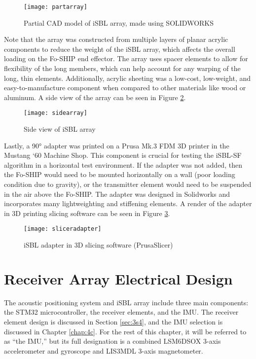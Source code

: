 \documentclass[12pt,a4paper]{report}
\begin{document}
\begin{figure}[htbp]
	\centering
	\texttt{[image: partarray]}
	\caption{Partial CAD model of iSBL array, made using SOLIDWORKS}
	\label{fig:partarray}
\end{figure}

Note that the array was constructed from multiple layers of planar acrylic components to reduce the weight of the iSBL array, which affects the overall loading on the Fo-SHIP end effector. The array uses spacer elements to allow for flexibility of the long members, which can help account for any warping of the long, thin elements. Additionally, acrylic sheeting was a low-cost, low-weight, and easy-to-manufacture component when compared to other materials like wood or aluminum. A side view of the array can be seen in Figure \ref{fig:sidearray}.

\begin{figure}[htbp]
	\centering
	\texttt{[image: sidearray]}
	\caption{Side view of iSBL array}
	\label{fig:sidearray}
\end{figure}

Lastly, a 90° adapter was printed on a Prusa Mk.3 FDM 3D printer in the Mustang ‘60 Machine Shop. This component is crucial for testing the iSBL-SF algorithm in a horizontal test environment. If the adapter was not added, then the Fo-SHIP would need to be mounted horizontally on a wall (poor loading condition due to gravity), or the transmitter element would need to be suspended in the air above the Fo-SHIP. The adapter was designed in Solidworks and incorporates many lightweighting and stiffening elements. A render of the adapter in 3D printing slicing software can be seen in Figure \ref{fig:sliceradapter}.

\begin{figure}[htbp]
	\centering
	\texttt{[image: sliceradapter]}
	\caption{iSBL adapter in 3D slicing software (PrusaSlicer)}
	\label{fig:sliceradapter}
\end{figure}

\section{Receiver Array Electrical Design} \label{3s3}
The acoustic positioning system and iSBL array include three main components: the STM32 microcontroller, the receiver elements, and the IMU. The receiver element design is discussed in Section \ref{sec:3s4}, and the IMU selection is discussed in Chapter \ref{chap:4c}. For the rest of this chapter, it will be referred to as “the IMU,” but its full designation is a combined LSM6DSOX 3-axis accelerometer and gyroscope and LIS3MDL 3-axis magnetometer.
\end{document}
